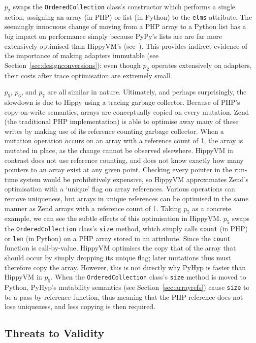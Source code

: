 \documentclass[a4paper,UKenglish]{lipics-v2016}
\newcommand{\ourvm}{PyHyp\xspace}
\newcommand{\hippy}{HippyVM\xspace}
\newcommand{\pypy}{PyPy\xspace}
\begin{document}
$p_2$ swaps the \texttt{OrderedCollection} class's constructor which performs a
single action, assigning an array (in PHP) or list (in Python) to the
\texttt{elms} attribute. The seemingly innocuous change of moving from a PHP
array to a Python list has a big impact on performance simply because \pypy's
lists are are far more extensively optimised than \hippy's
(see~\cite{bolz13strategies}). This provides indirect evidence of the importance
of making adapters immutable (see Section~\ref{sec:designconversions}): even
though $p_2$ operates extensively on adapters, their costs
after trace optimisation are extremely small.

$p_5$, $p_6$, and $p_7$ are all similar in nature. Ultimately, and perhaps
surprisingly, the slowdown is due to Hippy using a tracing garbage collector.
Because of PHP's copy-on-write semantics, arrays are
conceptually copied on every mutation. Zend (the traditional PHP implementation)
is able to optimise away many of these writes by making use of its reference
counting garbage collector. When a mutation operation occurs on an array with a reference count of 1,
the array is mutated in place, as the change cannot be
observed elsewhere. \hippy in contrast does not use reference counting, and does
not know exactly how many pointers to an array exist at any given point.
Checking every pointer in the run-time system would be prohibitively expensive,
so \hippy approximates Zend's optimisation with a `unique' flag on
array references. Various operations can remove uniqueness, but arrays
in unique references can be optimised in the same manner as Zend arrays with a
reference count of 1. Taking $p_5$ as a concrete
example, we can see the subtle effects of this optimisation in \hippy. $p_5$ swaps
the \texttt{OrderedCollection} class's \texttt{size} method, which simply calls
\texttt{count} (in PHP) or \texttt{len} (in Python) on a PHP array stored in an
attribute. Since the \texttt{count} function is call-by-value, \hippy optimises
the copy that of the array that should occur by simply dropping its unique flag;
later mutations thus must therefore copy the array.
However, this is not directly why \ourvm is faster than \hippy in $p_5$.
When the \texttt{OrderedCollection} class's \texttt{size} method is moved to
Python, \ourvm's mutability semantics (see Section~\ref{sec:arrayrefs})
cause \texttt{size} to be a pass-by-reference function, thus meaning that
the PHP reference does not lose uniqueness, and less copying is then required.


\subsection{Threats to Validity}
\end{document}

